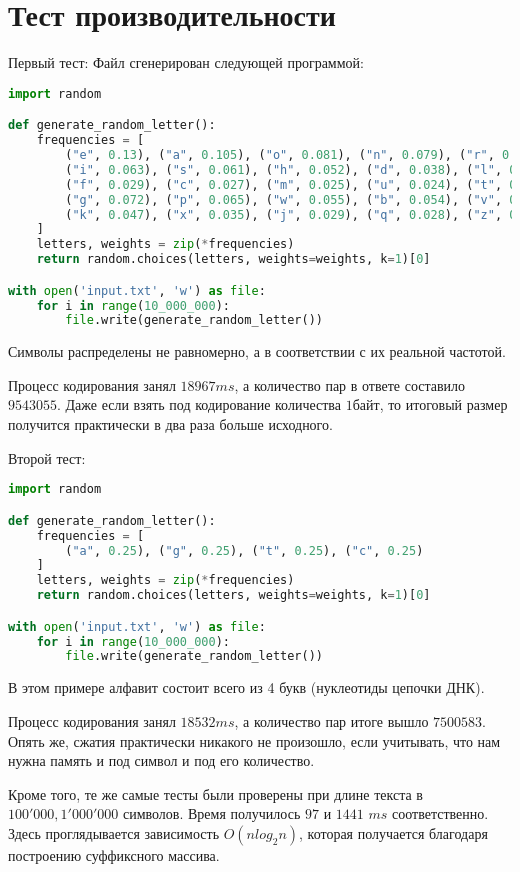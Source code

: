\section{Тест производительности}


Первый тест:
Файл сгенерирован следующей программой:

\begin{lstlisting}[language=python]
import random

def generate_random_letter():
    frequencies = [
        ("e", 0.13), ("a", 0.105), ("o", 0.081), ("n", 0.079), ("r", 0.071), 
        ("i", 0.063), ("s", 0.061), ("h", 0.052), ("d", 0.038), ("l", 0.034), 
        ("f", 0.029), ("c", 0.027), ("m", 0.025), ("u", 0.024), ("t", 0.24), 
        ("g", 0.072), ("p", 0.065), ("w", 0.055), ("b", 0.054), ("v", 0.052), 
        ("k", 0.047), ("x", 0.035), ("j", 0.029), ("q", 0.028), ("z", 0.023)
    ]
    letters, weights = zip(*frequencies)
    return random.choices(letters, weights=weights, k=1)[0]

with open('input.txt', 'w') as file:
    for i in range(10_000_000):
        file.write(generate_random_letter())
\end{lstlisting}

Символы распределены не равномерно, а в соответствии с их реальной частотой.

Процесс кодирования занял $18967 ms$, а количество пар в ответе составило $9543055$.
Даже если взять под кодирование количества $1 байт$, то итоговый размер получится практически в два раза больше исходного.

Второй тест:
\begin{lstlisting}[language=python]
import random

def generate_random_letter():
    frequencies = [
        ("a", 0.25), ("g", 0.25), ("t", 0.25), ("c", 0.25)
    ]
    letters, weights = zip(*frequencies)
    return random.choices(letters, weights=weights, k=1)[0]

with open('input.txt', 'w') as file:
    for i in range(10_000_000):
        file.write(generate_random_letter())
\end{lstlisting}

В этом примере алфавит состоит всего из 4 букв (нуклеотиды цепочки ДНК).

Процесс кодирования занял $18532ms$, а количество пар итоге вышло $7500583$. Опять же, сжатия практически никакого не произошло, если учитывать, что нам нужна память и под символ и под его количество.

Кроме того, те же самые тесты были проверены при длине текста в $100'000, 1'000'000$ символов.
Время получилось $97$ и $1441$ $ms$ соответственно. Здесь проглядывается зависимость $O(nlog_2n)$, которая получается благодаря построению суффиксного массива.
\pagebreak 

